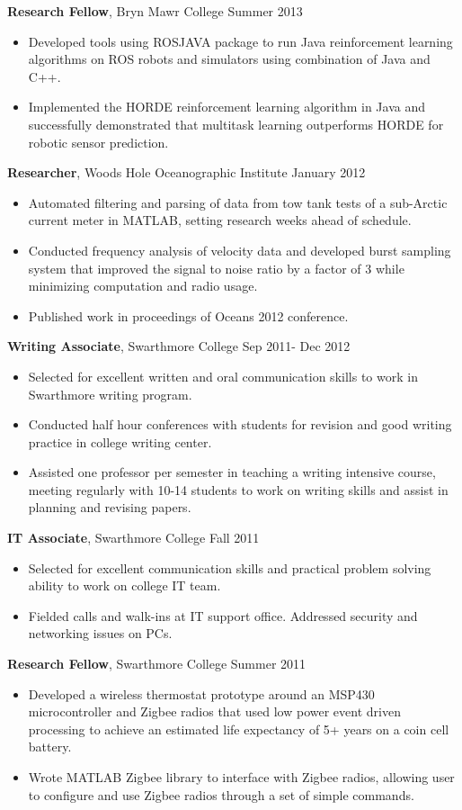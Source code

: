 \documentclass{article} %
\newcommand{\rjob}[2]{
\vspace{0.1cm}
\hspace*{-0.3cm}  
{\fontsize{10pt}{12pt}\selectfont #1} \hfill #2 
\vspace*{0.1cm} 
\hspace*{-1.2cm}
}
\newenvironment{ritemize}{
\hspace*{-0.8cm} 
\begin{minipage}{1.05\linewidth}
\begin{itemize}
}{
\end{itemize}
\end{minipage}
\vspace{-0.2cm}
}
\newcommand{\ritem}{
\item[-]
}
\begin{document}
\rjob{\textbf{Research Fellow}, Bryn Mawr College}{Summer 2013}\\
\begin{ritemize}
\ritem Developed tools using ROSJAVA package to run Java reinforcement learning algorithms on ROS robots and simulators using combination of Java and C++.
\ritem Implemented the HORDE reinforcement learning algorithm in Java and successfully demonstrated that multitask learning outperforms HORDE for robotic sensor prediction.
\end{ritemize}

\clearpage{}
\rjob{\textbf{Researcher}, Woods Hole Oceanographic Institute}{January 2012}\\
\begin{ritemize}
\ritem Automated filtering and parsing of data from tow tank tests of a sub-Arctic current meter in MATLAB, setting research weeks ahead of schedule.
\ritem Conducted frequency analysis of velocity data and developed burst sampling system that improved the signal to noise ratio by a factor of 3 while minimizing computation and radio usage. 
\ritem Published work in proceedings of Oceans 2012 conference.
\end{ritemize}


\rjob{\textbf{Writing Associate}, Swarthmore College}{Sep 2011- Dec 2012}\\
\begin{ritemize}
\ritem Selected for excellent written and oral communication skills to work in Swarthmore writing program.
\ritem Conducted half hour conferences with students for revision and good writing practice in college writing center.
\ritem Assisted one professor per semester in teaching a writing intensive course, meeting regularly with 10-14 students to work on writing skills and assist in planning and revising papers.
\end{ritemize}


\rjob{\textbf{IT Associate}, Swarthmore College}{Fall 2011}\\
\begin{ritemize} 
\ritem Selected for excellent communication skills and practical problem solving ability to work on college IT team.
\ritem Fielded calls and walk-ins at IT support office. Addressed security and networking issues on PCs. 
\end{ritemize}

\rjob{\textbf{Research Fellow}, Swarthmore College}{Summer 2011}\\
\begin{ritemize}
\ritem Developed a wireless thermostat prototype around an MSP430 microcontroller and Zigbee radios that used low power event driven processing to achieve an estimated life expectancy of 5+ years on a coin cell battery.
\ritem Wrote MATLAB Zigbee library to interface with Zigbee radios, allowing user to configure and use Zigbee radios through a set of simple commands.
\end{ritemize}
\end{document}
